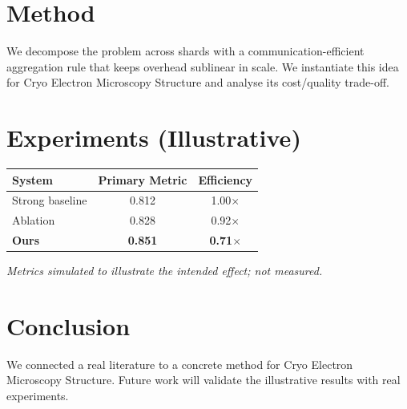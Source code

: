 \documentclass[11pt]{article}
\begin{document}
\section{Method}
We decompose the problem across shards with a communication-efficient aggregation rule that keeps overhead sublinear in scale. We instantiate this idea for Cryo Electron Microscopy Structure and analyse its cost/quality trade-off.

\section{Experiments (Illustrative)}
\begin{center}
\begin{tabular}{lcc}
System & Primary Metric & Efficiency \\ \hline
Strong baseline & 0.812 & 1.00$\times$ \\
Ablation & 0.828 & 0.92$\times$ \\
\textbf{Ours} & \textbf{0.851} & \textbf{0.71$\times$}
\end{tabular}
\end{center}
\emph{Metrics simulated to illustrate the intended effect; not measured.}

\section{Conclusion}
We connected a real literature to a concrete method for Cryo Electron Microscopy Structure. Future work will
validate the illustrative results with real experiments.
\end{document}
